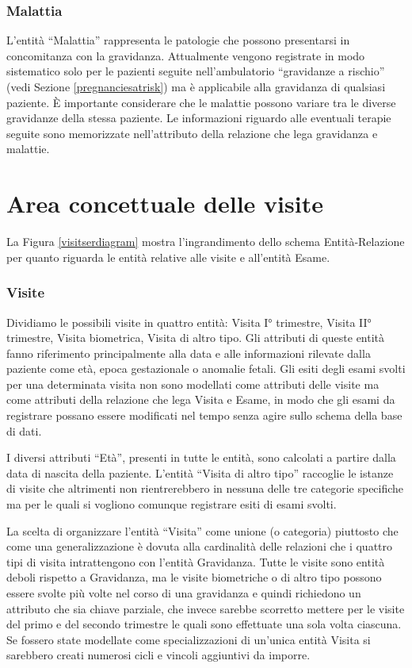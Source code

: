 \subsubsection{Malattia}

L'entità \enquote{Malattia} rappresenta le patologie che possono presentarsi in concomitanza con la gravidanza.
Attualmente vengono registrate in modo sistematico solo per le pazienti seguite nell'ambulatorio \enquote{gravidanze a rischio} (vedi Sezione \ref{pregnanciesatrisk}) ma è applicabile alla gravidanza di qualsiasi paziente.
È importante considerare che le malattie possono variare tra le diverse gravidanze della stessa paziente.
Le informazioni riguardo alle eventuali terapie seguite sono memorizzate nell'attributo della relazione che lega gravidanza e malattie.

\section{Area concettuale delle visite}
\label{visitsconceptual}

La Figura \ref{visitserdiagram} mostra l'ingrandimento dello schema Entità-Relazione per quanto riguarda le entità relative alle visite e all'entità Esame.

\subsubsection{Visite}

Dividiamo le possibili visite in quattro entità: Visita I° trimestre, Visita II° trimestre, Visita biometrica, Visita di altro tipo.
Gli attributi di queste entità fanno riferimento principalmente alla data e alle informazioni rilevate dalla paziente come età, epoca gestazionale o anomalie fetali.
Gli esiti degli esami svolti per una determinata visita non sono modellati come attributi delle visite ma come attributi della relazione che lega Visita e Esame, in modo che gli esami da registrare possano essere modificati nel tempo senza agire sullo schema della base di dati.

I diversi attributi \enquote{Età}, presenti in tutte le entità, sono calcolati a partire dalla data di nascita della paziente.
L'entità \enquote{Visita di altro tipo} raccoglie le istanze di visite che altrimenti non rientrerebbero in nessuna delle tre categorie specifiche ma per le quali si vogliono comunque registrare esiti di esami svolti.

La scelta di organizzare l'entità \enquote{Visita} come unione (o categoria) piuttosto che come una generalizzazione è dovuta alla cardinalità delle relazioni che i quattro tipi di visita intrattengono con l'entità Gravidanza.
Tutte le visite sono entità deboli rispetto a Gravidanza, ma le visite biometriche o di altro tipo possono essere svolte più volte nel corso di una gravidanza e quindi richiedono un attributo che sia chiave parziale, che invece sarebbe scorretto mettere per le visite del primo e del secondo trimestre le quali sono effettuate una sola volta ciascuna.
Se fossero state modellate come specializzazioni di un'unica entità Visita si sarebbero creati numerosi cicli e vincoli aggiuntivi da imporre. 

